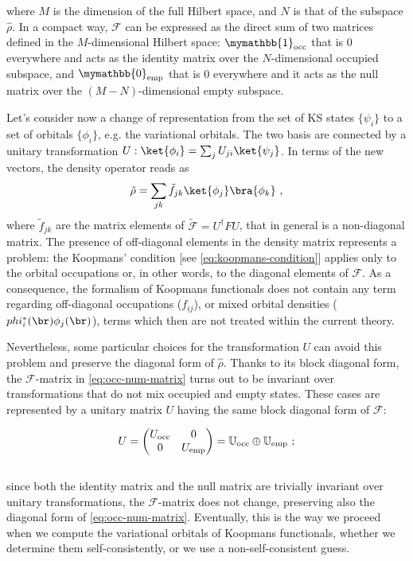 where $M$ is the dimension of the full Hilbert space, and $N$ is that of the subspace $\hat{\rho}$. In a compact way, $\mathcal{F}$ can be expressed as the direct sum of two matrices defined in the $M$-dimensional Hilbert space: $\mymathbb{1}_{\rm occ}$ that is 0 everywhere and acts as the identity matrix over the $N$-dimensional occupied subspace, and $\mymathbb{0}_{\rm emp}$ that is 0 everywhere and it acts as the null matrix over the $(M-N)$-dimensional empty subspace.

Let's consider now a change of representation from the set of KS states $\{ \psi_i \}$ to a set of orbitals $\{ \phi_i \}$, e.g. the variational orbitals. The two basis are connected by a unitary transformation $U: \ket{\phi_i} = \sum_j U_{ji} \ket{\psi_j}$. In terms of the new vectors, the density operator reads as
%
\begin{equation}
    \hat{\rho} = \sum_{jk} \tilde{f}_{jk} \ket{\phi_j} \bra{\phi_k} \ ,
    \label{eq:density-matrix-off-diag}
\end{equation}
%
where $\tilde{f}_{jk}$ are the matrix elements of $\tilde{\mathcal{F}} = U^{\dagger} F U$, that in general is a non-diagonal matrix. The presence of off-diagonal elements in the density matrix represents a problem: the Koopmans' condition [see \cref{eq:koopmans-condition}] applies only to the orbital occupations or, in other words, to the diagonal elements of $\mathcal{F}$. As a consequence, the formalism of Koopmans functionals does not contain any term regarding off-diagonal occupations ($f_{ij}$), or mixed orbital densities ($phi_i^*(\br) \phi_j(\br)$), terms which then are not treated within the current theory.

Nevertheless, some particular choices for the transformation $U$ can avoid this problem and preserve the diagonal form of $\hat{\rho}$. Thanks to its block diagonal form, the $\mathcal{F}$-matrix in \eqref{eq:occ-num-matrix} turns out to be invariant over transformations that do not mix occupied and empty states. These cases are represented by a unitary matrix $U$ having the same block diagonal form of $\mathcal{F}$:

\begin{equation}
    U = 
    \begin{pmatrix}
        U_{\rm occ} & 0 \\
        0 & U_{\rm emp}
    \end{pmatrix}
     = \mathbb{U}_{\rm occ} \oplus \mathbb{U}_{\rm emp} \ ;
     \label{eq:U-matrix-separate}
\end{equation} \\
%
since both the identity matrix and the null matrix are trivially invariant over unitary transformations, the $\mathcal{F}$-matrix does not change, preserving also the diagonal form of \cref{eq:occ-num-matrix}. Eventually, this is the way we proceed when we compute the variational orbitals of Koopmans functionals, whether we determine them self-consistently, or we use a non-self-consistent guess. 

